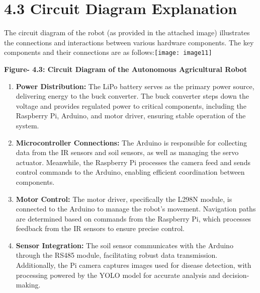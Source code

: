 \documentclass{book} %
\begin{document}
\noindent 
\section{4.3 Circuit Diagram Explanation}

\noindent The circuit diagram of the robot (as provided in the attached image) illustrates the connections and interactions between various hardware components. The key components and their connections are as follows:\texttt{[image: image11]}

\noindent 

\textbf{}

\textbf{}

\textbf{}

\noindent \textbf{}

\noindent \textbf{     Figure- 4.3: Circuit Diagram of the Autonomous Agricultural Robot}

\noindent \textbf{}

\begin{enumerate}
\item \textbf{ Power Distribution: }The LiPo battery serves as the primary power source, delivering energy to the buck converter. The buck converter steps down the voltage and provides regulated power to critical components, including the Raspberry Pi, Arduino, and motor driver, ensuring stable operation of the system.

\item  \textbf{Microcontroller Connections: }The Arduino is responsible for collecting data from the IR sensors and soil sensors, as well as managing the servo actuator. Meanwhile, the Raspberry Pi processes the camera feed and sends control commands to the Arduino, enabling efficient coordination between components.

\item  \textbf{Motor Control: }The motor driver, specifically the L298N module, is connected to the Arduino to manage the robot's movement. Navigation paths are determined based on commands from the Raspberry Pi, which processes feedback from the IR sensors to ensure precise control.

\item  \textbf{Sensor Integration: }The soil sensor communicates with the Arduino through the RS485 module, facilitating robust data transmission. Additionally, the Pi camera captures images used for disease detection, with processing powered by the YOLO model for accurate analysis and decision-making.
\end{enumerate}
\end{document}
